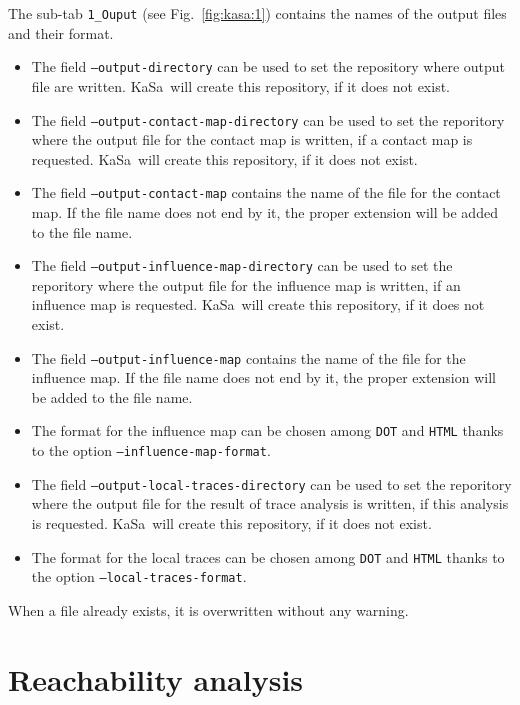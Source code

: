 \documentclass[11pt]{book}
\def\KaSa{\textsf{KaSa}}
\begin{document}
The sub-tab \texttt{1\_Ouput} (see Fig.~\ref{fig:kasa:1}) contains the names of the output files and their format.

\begin{itemize}
\item The field \texttt{--output-directory} can be used to set the repository where output file are written. \KaSa~will create this repository, if it does not exist.
\item The field \texttt{--output-contact-map-directory} can be used to set the reporitory where the output file for the contact map is written, if a contact map is requested. \KaSa~will create this repository, if it does not exist.
\item The field \texttt{--output-contact-map} contains the name of the file for the contact map. If the file name does not end by it, the proper extension will be added to the file name.
\item The field \texttt{--output-influence-map-directory} can be used to set the reporitory where the output file for the influence map is written, if an influence map is requested. \KaSa~will create this repository, if it does not exist.
\item The field \texttt{--output-influence-map} contains the name of the file for the influence map. If the file name does not end by it, the proper extension will be added to the file name.
\item The format for the influence map can be chosen among \texttt{DOT} and \texttt{HTML} thanks to the option \texttt{--influence-map-format}.
\item The field \texttt{--output-local-traces-directory} can be used to set the reporitory where the output file for the result of trace analysis is written, if this analysis is requested. \KaSa~will create this repository, if it does not exist.
\item The format for the local traces can be chosen among \texttt{DOT} and \texttt{HTML} thanks to the option \texttt{--local-traces-format}.


\end{itemize}

When a file already exists, it is overwritten without any warning.

\section{Reachability analysis}
\end{document}
